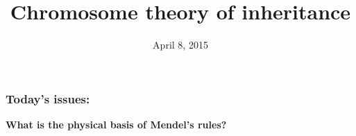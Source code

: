 





\title[Chromosome theory of inheritance]{Chromosome theory of inheritance}
\date{April 8, 2015}



\begin{noheadline}
\maketitle
\end{noheadline}


\begin{noheadline}
\begin{frame}
\frametitle{Today's issues:}
\textbf{What is the physical basis of Mendel's rules?} \\
\vspace{5mm}
\tableofcontents[subsectionstyle=hide]
\end{frame}
\end{noheadline}

